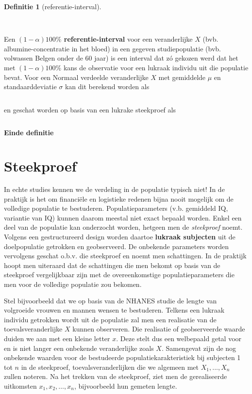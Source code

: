 \documentclass[
  dutch,
  letterpaper,
  12pt]{book}
\theoremstyle{definition}
\theoremstyle{definition}
\newtheorem{definition}{Definitie}[chapter]
\theoremstyle{definition}
\theoremstyle{remark}
\begin{document}
\begin{definition}[referentie-interval]\protect\hypertarget{def-referentie-interval}{}\label{def-referentie-interval}

~

\end{definition}

Een \textbf{\((1-\alpha)100\%\) referentie-interval} voor een
veranderlijke \(X\) (bvb. albumine-concentratie in het bloed) in een
gegeven studiepopulatie (bvb. volwassen Belgen onder de 60 jaar) is een
interval dat zó gekozen werd dat het met \((1-\alpha)100\%\) kans de
observatie voor een lukraak individu uit die populatie bevat. Voor een
Normaal verdeelde veranderlijke \(X\) met gemiddelde \(\mu\) en
standaarddeviatie \(\sigma\) kan dit berekend worden als

\begin{equation*}
[\mu-z_{\alpha/2}\sigma,\mu+z_{\alpha/2}\sigma]
\end{equation*}

en geschat worden op basis van een lukrake steekproef als

\begin{equation*}
[\bar x-z_{\alpha/2}s_x,\bar x+z_{\alpha/2}s_x]
\end{equation*}

\textbf{Einde definitie}

\section{Steekproef}\label{steekproef}

In echte studies kennen we de verdeling in de populatie typisch niet! In
de praktijk is het om financiële en logistieke redenen bijna nooit
mogelijk om de volledige populatie te bestuderen. Populatieparameters
(v.b. gemiddeld IQ, variantie van IQ) kunnen daarom meestal niet exact
bepaald worden. Enkel een deel van de populatie kan onderzocht worden,
hetgeen men de \emph{steekproef} noemt. Volgens een gestructureerd
design worden daartoe \textbf{lukraak subjecten} uit de doelpopulatie
getrokken en geobserveerd. De onbekende parameters worden vervolgens
geschat o.b.v. die steekproef en noemt men schattingen. In de praktijk
hoopt men uiteraard dat de schattingen die men bekomt op basis van de
steekproef vergelijkbaar zijn met de overeenkomstige populatieparameters
die men voor de volledige populatie zou bekomen.

Stel bijvoorbeeld dat we op basis van de NHANES studie de lengte van
volgroeide vrouwen en mannen wensen te bestuderen. Telkens een lukraak
individu getrokken wordt uit de populatie zal men een realisatie van de
toevalsveranderlijke \(X\) kunnen observeren. Die realisatie of
geobserveerde waarde duiden we aan met een kleine letter \(x\). Deze
stelt dus een welbepaald getal voor en is niet langer een onbekende
veranderlijke zoals \(X\). Samengevat zijn de nog onbekende waarden voor
de bestudeerde populatiekarakteristiek bij subjecten 1 tot \(n\) in de
steekproef, toevalsveranderlijken die we algemeen met \(X_1,...,X_n\)
zullen noteren. Na het trekken van de steekproef, ziet men de
gerealiseerde uitkomsten \(x_1, x_2, \dots, x_n\), bijvoorbeeld hun
gemeten lengte.
\end{document}
